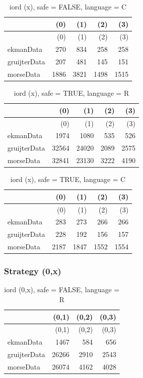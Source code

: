 \documentclass[
  12pt,
  letterpaper,
  DIV=11,
  numbers=noendperiod]{scrartcl}
\begin{document}
\begin{longtable}[]{@{}lrrrr@{}}
\caption{iord (x), safe = FALSE, language = C}\tabularnewline
\toprule\noalign{}
& (0) & (1) & (2) & (3) \\
\midrule\noalign{}
\endfirsthead
\toprule\noalign{}
& (0) & (1) & (2) & (3) \\
\midrule\noalign{}
\endhead
\bottomrule\noalign{}
\endlastfoot
ekmanData & 270 & 834 & 258 & 258 \\
gruijterData & 207 & 481 & 145 & 151 \\
morseData & 1886 & 3821 & 1498 & 1515 \\
\end{longtable}

\begin{longtable}[]{@{}lrrrr@{}}
\caption{iord (x), safe = TRUE, language = R}\tabularnewline
\toprule\noalign{}
& (0) & (1) & (2) & (3) \\
\midrule\noalign{}
\endfirsthead
\toprule\noalign{}
& (0) & (1) & (2) & (3) \\
\midrule\noalign{}
\endhead
\bottomrule\noalign{}
\endlastfoot
ekmanData & 1974 & 1080 & 535 & 526 \\
gruijterData & 32564 & 24020 & 2089 & 2575 \\
morseData & 32841 & 23130 & 3222 & 4190 \\
\end{longtable}

\begin{longtable}[]{@{}lrrrr@{}}
\caption{iord (x), safe = TRUE, language = C}\tabularnewline
\toprule\noalign{}
& (0) & (1) & (2) & (3) \\
\midrule\noalign{}
\endfirsthead
\toprule\noalign{}
& (0) & (1) & (2) & (3) \\
\midrule\noalign{}
\endhead
\bottomrule\noalign{}
\endlastfoot
ekmanData & 283 & 273 & 266 & 266 \\
gruijterData & 228 & 192 & 156 & 157 \\
morseData & 2187 & 1847 & 1552 & 1554 \\
\end{longtable}

\subsubsection{Strategy (0,x)}\label{strategy-0x-1}

\begin{longtable}[]{@{}lrrr@{}}
\caption{iord (0,x), safe = FALSE, language = R}\tabularnewline
\toprule\noalign{}
& (0,1) & (0,2) & (0,3) \\
\midrule\noalign{}
\endfirsthead
\toprule\noalign{}
& (0,1) & (0,2) & (0,3) \\
\midrule\noalign{}
\endhead
\bottomrule\noalign{}
\endlastfoot
ekmanData & 1467 & 584 & 656 \\
gruijterData & 26266 & 2910 & 2543 \\
morseData & 26074 & 4162 & 4028 \\
\end{longtable}
\end{document}
